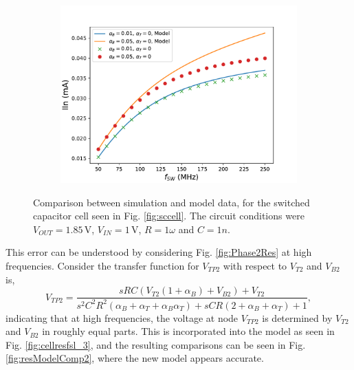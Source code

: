 \begin{figure}
\begin{subfigure}{0.48\linewidth}
		\end{subfigure}
		\begin{subfigure}{0.48\linewidth}
			\includegraphics[width=\linewidth]{4Terminal/Figures/IIN_3.pdf}
		\end{subfigure}
		\caption{Comparison between simulation and model data, for the switched capacitor cell seen in Fig. \ref{fig:sccell}. The circuit conditions were $V_{OUT} = 1.85\,$V, $V_{IN} = 1\,$V, $R = 1\omega$ and $C = 1n$.}
		\label{fig:resModelcomp}
	\end{figure}
	
	This error can be understood by considering Fig. \ref{fig:Phase2Res} at high frequencies. Consider the transfer function for $V_{TP2}$ with respect to $V_{T2}$ and $V_{B2}$ is,
	\begin{equation}
		V_{TP2} = \frac{sRC(V_{T2}(1+\alpha_B) + V_{B2}) + V_{T2}}{s^2C^2R^2(\alpha_B + \alpha_T + \alpha_B\alpha_T) + sCR(2+\alpha_B+\alpha_T) + 1},
	\end{equation}
	indicating that at high frequencies, the voltage at node $V_{TP2}$ is determined by $V_{T2}$ and $V_{B2}$ in roughly equal parts. This is incorporated into the model as seen in Fig. \ref{fig:cellresfsl_3}, and the resulting comparisons can be seen in Fig. \ref{fig:resModelComp2}, where the new model appears accurate.

